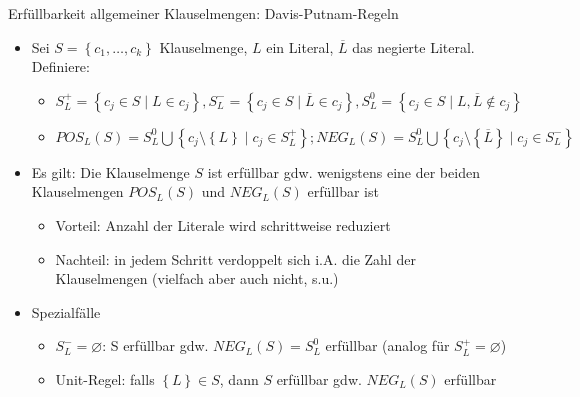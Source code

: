 \begin{frame}{Erfüllbarkeit allgemeiner Klauselmengen: Davis-Putnam-Regeln}
	\begin{itemize}
		\item Sei $S=\left\{c_1, \ldots, c_k\right\}$ Klauselmenge, $L$ ein Literal, $\overline{L}$ das negierte Literal. Definiere:
		\begin{itemize}
			\item $S_L^+=\left\{c_j \in S \mid L \in c_j\right\}, S_L^-=\left\{c_j \in S \mid \overline{L} \in c_j\right\}, S_L^0=\left\{c_j \in S \mid L, \overline{L} \notin c_j\right\}$
			\item $POS_L(S)=S_L^0 \bigcup \left\{c_j \setminus \left\{L\right\} \mid c_j \in S_L^+\right\}; NEG_L(S)=S_L^0 \bigcup \left\{c_j \setminus \left\{\overline{L}\right\} \mid c_j \in S_L^-\right\}$
		\end{itemize}
		\item Es gilt: Die Klauselmenge $S$ ist erfüllbar gdw. wenigstens eine der beiden Klauselmengen $POS_L(S)$ und $NEG_L(S)$ erfüllbar ist
		\begin{itemize}
			\item Vorteil: Anzahl der Literale wird schrittweise reduziert
			\item Nachteil: in jedem Schritt verdoppelt sich i.A. die Zahl der Klauselmengen (vielfach aber auch nicht, s.u.)
		\end{itemize}
		\item Spezialfälle
		\begin{itemize}
			\item $S_L^-=\varnothing$: S erfüllbar gdw. $NEG_L(S)=S_L^0$ erfüllbar (analog für $S_L^+=\varnothing$)
			\item Unit-Regel: falls $\left\{L\right\} \in S$, dann $S$ erfüllbar gdw. $NEG_L(S)$ erfüllbar
		\end{itemize}
	\end{itemize}
\end{frame}

